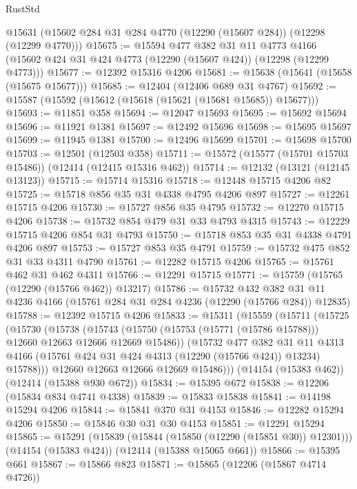 \begin{lexlean}{RustStd}
\begin{coremodule}
{\begin{coremodule}
{{{{{{{{{{{{{{{{{{{{{{{{{{{{{{{{{{{{{{{{{{{{{{{{{{    @15631
    (@15602 @284 @31 @284 @4770 (@12290 (@15607 @284)) (@12298 (@12299 @4770)))
@15675 := @15594
    @477
    @382
    @31
    @11
    @4773
    @4166
    (@15602 @424 @31 @424 @4773 (@12290 (@15607 @424)) (@12298 (@12299 @4773)))
@15677 := @12392 @15316 @4206
@15681 := @15638 (@15641 (@15658 (@15675 @15677)))
@15685 := @12404 (@12406 @689 @31 @4767)
@15692 := @15587 (@15592 (@15612 (@15618 (@15621 (@15681 @15685)) @15677)))
@15693 := @11851 @358
@15694 := @12047 @15693
@15695 := @15692 @15694
@15696 := @11921 @1381
@15697 := @12492 @15696
@15698 := @15695 @15697
@15699 := @11945 @1381
@15700 := @12496 @15699
@15701 := @15698 @15700
@15703 := @12501 (@12503 @358)
@15711 := @15572 (@15577 (@15701 @15703 @15486)) (@12414 (@12415 @15316 @462))
@15714 := @12132 (@13121 (@12145 @13123))
@15715 := @15714 @15316
@15718 := @12448 @15715 @4206 @82
@15725 := @15718 @856 @35 @31 @4338 @4795 @4206 @897
@15727 := @12261 @15715 @4206
@15730 := @15727 @856 @35 @4795
@15732 := @12270 @15715 @4206
@15738 := @15732 @854 @479 @31 @33 @4793 @4315
@15743 := @12229 @15715 @4206 @854 @31 @4793
@15750 := @15718 @853 @35 @31 @4338 @4791 @4206 @897
@15753 := @15727 @853 @35 @4791
@15759 := @15732 @475 @852 @31 @33 @4311 @4790
@15761 := @12282 @15715 @4206
@15765 := @15761 @462 @31 @462 @4311
@15766 := @12291 @15715
@15771 := @15759 (@15765 (@12290 (@15766 @462)) @13217)
@15786 := @15732
    @432
    @382
    @31
    @11
    @4236
    @4166
    (@15761 @284 @31 @284 @4236 (@12290 (@15766 @284)) @12835)
@15788 := @12392 @15715 @4206
@15833 := @15311
    (@15559
      (@15711
        (@15725
          (@15730
            (@15738
              (@15743 (@15750 (@15753 (@15771 (@15786 @15788))) @12660 @12663 @12666 @12669 @15486))
              (@15732
                @477
                @382
                @31
                @11
                @4313
                @4166
                (@15761 @424 @31 @424 @4313 (@12290 (@15766 @424)) @13234)
                @15788)))
          @12660
          @12663
          @12666
          @12669
          @15486)))
    (@14154 (@15383 @462))
    (@12414 (@15388 @930 @672))
@15834 := @15395 @672
@15838 := @12206 (@15834 @834 @4741 @4338)
@15839 := @15833 @15838
@15841 := @14198 @15294 @4206
@15844 := @15841 @370 @31 @4153
@15846 := @12282 @15294 @4206
@15850 := @15846 @30 @31 @30 @4153
@15851 := @12291 @15294
@15865 := @15291
    (@15839 (@15844 (@15850 (@12290 (@15851 @30)) @12301)))
    (@14154 (@15383 @424))
    (@12414 (@15388 @15065 @661))
@15866 := @15395 @661
@15867 := @15866 @823
@15871 := @15865 (@12206 (@15867 @4714 @4726))
}}}}}}}}}}}}}}}}}}}}}}}}}}}}}}}}}}}}}}}}}}}}}}}}}}
\end{coremodule}}
\end{coremodule}
\end{lexlean}
